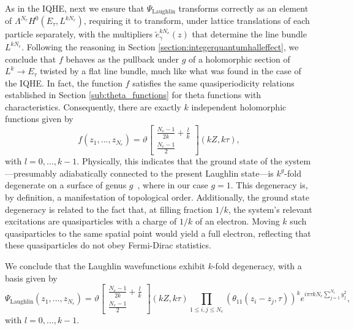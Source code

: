 \documentclass[a4paper,11pt]{article}
\begin{document}
As in the IQHE, next we ensure that $\Psi_{\mathrm{Laughlin}}$ transforms correctly as an element of $\Lambda^{N_{e}}H^{0}(E_{\tau},L^{kN_{e}})$, requiring it to transform, under lattice translations of each particle separately, with the multipliers $\widetilde{e}^{kN_{e}}_{\gamma}(z)$ that determine the line bundle $L^{kN_e}$. Following the reasoning in Section \ref{section:integerquantumhalleffect}, we conclude that $f$ behaves as the pullback under $g$ of a holomorphic section of $L^{k}\to E_{\tau}$ twisted by a flat line bundle, much like what was found in the case of the IQHE. In fact, the function $f$ satisfies the same quasiperiodicity relations established in Section \ref{sub:theta_functions} for theta functions with characteristics. Consequently, there are exactly $k$ independent holomorphic functions given by
\begin{equation*}
f(z_{1},...,z_{N_e}) = \vartheta\begin{bmatrix}
\frac{N_e-1}{2k}+\frac{l}{k}\\
\frac{N_e-1}{2}
\end{bmatrix}(kZ,k\tau),
\end{equation*}
with $l=0,...,k-1$. 
Physically, this indicates that the ground state of the system---presumably adiabatically connected to the present Laughlin state---is $k^g$-fold degenerate on a surface of genus $g$~\cite{wen:niu:1990}, where in our case $g=1$. This degeneracy is, by definition, a manifestation of topological order. Additionally, the ground state degeneracy is related to the fact that, at filling fraction $1/k$, the system's relevant excitations are quasiparticles with a charge of $1/k$ of an electron. Moving $k$ such quasiparticles to the same spatial point would yield a full electron, reflecting that these quasiparticles do not obey Fermi-Dirac statistics.



We conclude that the Laughlin wavefunctions exhibit $k$-fold degeneracy, with a basis given by
\begin{equation}
    \Psi_{\mathrm{Laughlin}}(z_{1},...,z_{N_e})=\vartheta\begin{bmatrix}
\frac{N_e-1}{2k}+\frac{l}{k}\\
\frac{N_e-1}{2}
\end{bmatrix}(kZ,k\tau)\prod_{1\leq i,j\leq N_{e}}(\theta_{11}(z_{i}-z_{j},\tau))^{k}e^{i\pi \tau k N_{e}\sum_{j=1}^{N_e}y^2_j},
\label{eq:Laughlinfractional}
\end{equation}
with $l=0,...,k-1$.
\end{document}

